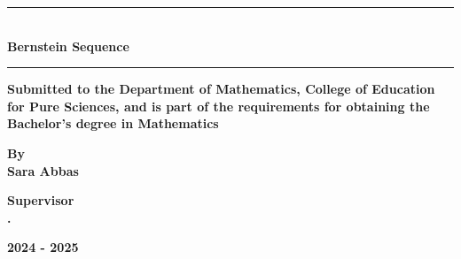 \begin{titlepage}
\begin{minipage}{0.2\textwidth}
	\end{minipage}
	\vspace{1cm}
	\begin{center}
		\rule{100mm}{0.5mm}\\
		\Large \textbf{Bernstein Sequence}\\
		\rule{100mm}{0.5mm}
	\end{center}
	\vfill
	\begin{center}
		\textbf{Submitted to the Department of Mathematics, College of Education for Pure Sciences, and is part of the requirements for obtaining the Bachelor’s degree in Mathematics}
	\end{center}
	\vfill
	\begin{center}
		\textbf{By}\\
		\textbf{Sara Abbas}
	\end{center}
	\vfill
	\begin{center}
		\textbf{Supervisor}\\
		\textbf{.}
	\end{center}
	\vfill
	\begin{center}
		\textbf{2024 - 2025}
	\end{center}
\end{titlepage}
